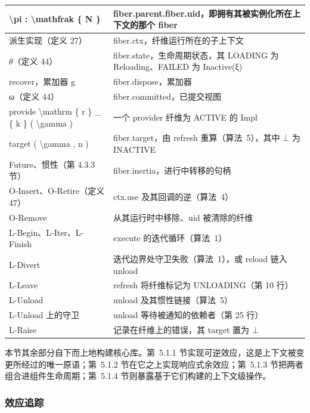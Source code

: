 \documentclass[
  10
]{article}
\begin{document}
{\begin{longtable}[]{@{}|l|l|@{}}
\hline
\textbackslash pi : \textbackslash mathfrak \{ N \} & fiber.parent.fiber.uid，即拥有其被实例化所在上下文的那个 fiber \\
\hline
派生实现（定义 27） & fiber.ctx，纤维运行所在的子上下文 \\
\hline
$\theta$（定义 44） & fiber.state，生命周期状态，其 LOADING 为 Reloading、FAILED 为 Inactive(ξ) \\
\hline
recover，累加器 g & fiber.dispose，累加器 \\
\hline
ω（定义 44） & fiber.committed，已提交视图 \\
\hline
provide \textbackslash mathrm \{ r \} \_ \{ k \} ( \textbackslash gamma ) & 一个 provider 纤维为 ACTIVE 的 Impl \\
\hline
target ( \textbackslash gamma , n ) & fiber.target，由 refresh 重算（算法~5），其中 $\bot$ 为 INACTIVE \\
\hline
Future、惯性（第 4.3.3 节） & fiber.inertia，进行中转移的句柄 \\
\hline
O-Insert、O-Retire（定义 47） & ctx.use 及其回调的逆（算法~4） \\
\hline
O-Remove & 从其运行时中移除、uid 被清除的纤维 \\
\hline
L-Begin、L-Iter、L-Finish & execute 的迭代循环（算法~1） \\
\hline
L-Divert & 迭代边界处守卫失败（算法~1），或 reload 链入 unload \\
\hline
L-Leave & refresh 将纤维标记为 UNLOADING（第 10 行） \\
\hline
L-Unload & unload 及其惯性链接（算法~5） \\
\hline
L-Unload 上的守卫 & unload 等待被通知的依赖者（第 25 行） \\
\hline
L-Raise & 记录在纤维上的错误，其 target 置为 $\bot$ \\
\hline
\end{longtable}
}

本节其余部分自下而上地构建核心库。第~5.1.1 节实现可逆效应，这是上下文被变更所经过的唯一原语；第~5.1.2 节在它之上实现响应式余效应；第~5.1.3 节把两者组合进组件生命周期；第~5.1.4 节则暴露基于它们构建的上下文级操作。

\subsubsection{效应追踪} \label{efect-tracking}
\end{document}
